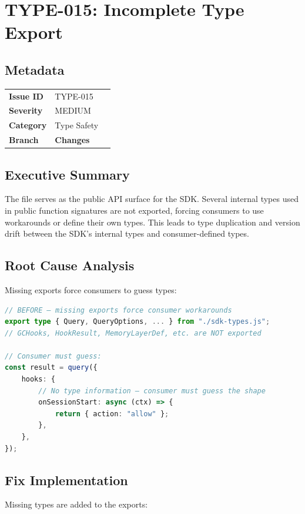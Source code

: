 \section{TYPE-015: Incomplete Type Export}
\label{sec:type-015}
\subsection*{Metadata}
\begin{tabular}{ll}
\textbf{Issue ID} & TYPE-015 \\
\textbf{Severity} & MEDIUM \\
\textbf{Category} & Type Safety \\
\textbf{Branch} & 
\textbf{Changes} &  \\
\end{tabular}

\subsection*{Executive Summary}
The  file serves as the public API surface for the SDK. Several internal types used in public function signatures are not exported, forcing consumers to use  workarounds or define their own types. This leads to type duplication and version drift between the SDK's internal types and consumer-defined types.

\subsection*{Root Cause Analysis}
Missing exports force consumers to guess types:

\begin{lstlisting}[language=TypeScript]
// BEFORE — missing exports force consumer workarounds
export type { Query, QueryOptions, ... } from "./sdk-types.js";
// GCHooks, HookResult, MemoryLayerDef, etc. are NOT exported

// Consumer must guess:
const result = query({
    hooks: {
        // No type information — consumer must guess the shape
        onSessionStart: async (ctx) => {
            return { action: "allow" };
        },
    },
});
\end{lstlisting}

\subsection*{Fix Implementation}
Missing types are added to the exports:

